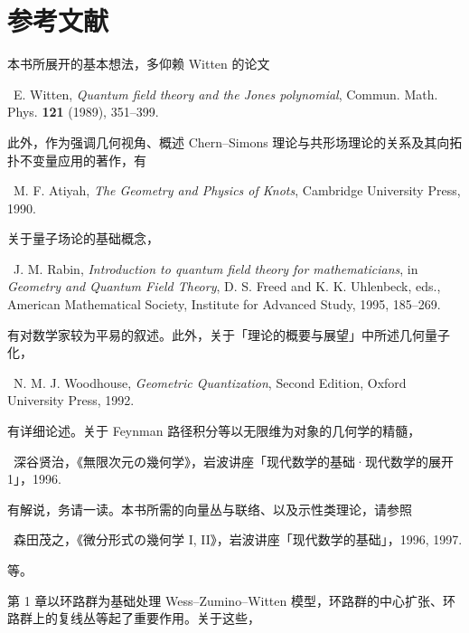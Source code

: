 
\chapter*{参考文献}

本书所展开的基本想法，多仰赖 Witten 的论文

\noindent [1]\ E. Witten, \textit{Quantum field theory and the Jones polynomial}, Commun. Math. Phys. \textbf{121} (1989), 351--399.

\noindent 此外，作为强调几何视角、概述 Chern--Simons 理论与共形场理论的关系及其向拓扑不变量应用的著作，有

\noindent [2]\ M. F. Atiyah, \textit{The Geometry and Physics of Knots}, Cambridge University Press, 1990.

\noindent 关于量子场论的基础概念，

\noindent [3]\ J. M. Rabin, \textit{Introduction to quantum field theory for mathematicians}, in \textit{Geometry and Quantum Field Theory}, D. S. Freed and K. K. Uhlenbeck, eds., American Mathematical Society, Institute for Advanced Study, 1995, 185--269.

\noindent 有对数学家较为平易的叙述。此外，关于「理论的概要与展望」中所述几何量子化，

\noindent [4]\ N. M. J. Woodhouse, \textit{Geometric Quantization}, Second Edition, Oxford University Press, 1992.

\noindent 有详细论述。关于 Feynman 路径积分等以无限维为对象的几何学的精髓，

\noindent [5]\ 深谷贤治，《無限次元の幾何学》，岩波讲座「现代数学的基础·现代数学的展开 1」，1996.

\noindent 有解说，务请一读。本书所需的向量丛与联络、以及示性类理论，请参照

\noindent [6]\ 森田茂之，《微分形式の幾何学 I, II》，岩波讲座「现代数学的基础」，1996, 1997.

\noindent 等。

第 1 章以环路群为基础处理 Wess--Zumino--Witten 模型，环路群的中心扩张、环路群上的复线丛等起了重要作用。关于这些，

